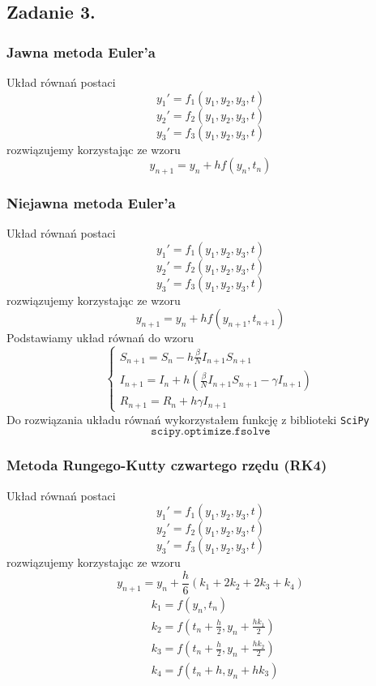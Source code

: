 \documentclass[11pt, leqno]{scrartcl}
\begin{document}
    \subsection{Zadanie 3.}
    \subsubsection{Jawna metoda Euler'a}
    Układ równań postaci
    \[
        y_1'=f_1(y_1,y_2,y_3,t)
    \]
    \[
        y_2'=f_2(y_1,y_2,y_3,t)
    \]
    \[
        y_3'=f_3(y_1,y_2,y_3,t)
    \]
    rozwiązujemy korzystając ze wzoru
    \[
        y_{n+1}=y_n+hf(y_n,t_n)
    \]
    \subsubsection{Niejawna metoda Euler'a}
    Układ równań postaci
    \[
        y_1'=f_1(y_1,y_2,y_3,t)
    \]
    \[
        y_2'=f_2(y_1,y_2,y_3,t)
    \]
    \[
        y_3'=f_3(y_1,y_2,y_3,t)
    \]
    rozwiązujemy korzystając ze wzoru
    \[
        y_{n+1}=y_n+hf(y_{n+1}, t_{n+1})
    \]
    Podstawiamy układ równań do wzoru
    \[
        \begin{cases}
            S_{n+1}=S_n-h\frac{\beta}{N}I_{n+1}S_{n+1} \\
            I_{n+1}=I_n+h \left( \frac{\beta}{N}I_{n+1}S_{n+1}
                -\gamma I_{n+1} \right) \\
            R_{n+1}=R_n+h\gamma I_{n+1}
        \end{cases}
    \]
    Do rozwiązania układu równań wykorzystałem funkcję z biblioteki
    \texttt{SciPy}
    \[
        \texttt{scipy.optimize.fsolve}
    \]
    \subsubsection{Metoda Rungego-Kutty czwartego rzędu (RK4)}
    Układ równań postaci
    \[
        y_1'=f_1(y_1,y_2,y_3,t)
    \]
    \[
        y_2'=f_2(y_1,y_2,y_3,t)
    \]
    \[
        y_3'=f_3(y_1,y_2,y_3,t)
    \]
    rozwiązujemy korzystając ze wzoru
    \[
        y_{n+1}=y_n+\frac{h}{6}(k_1+2k_2+2k_3+k_4)
    \]
    \begin{align*}
        &k_1=f(y_n,t_n) \\
        &k_2=f \left( t_n+\frac{h}{2},
            y_n+\frac{hk_1}{2} \right) \\
        &k_3=f \left( t_n+\frac{h}{2},
            y_n+\frac{hk_2}{2} \right) \\
        &k_4=f(t_n+h,y_n+hk_3)
    \end{align*}
\end{document}
